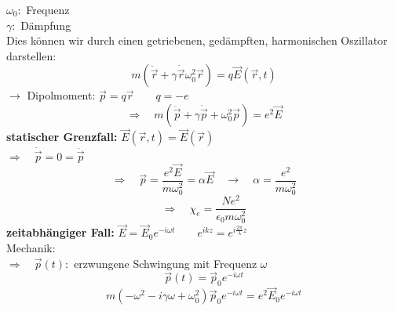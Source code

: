 \begin{center}
\end{center}
$ \omega_0 : $ Frequenz\\
$ \gamma : $ Dämpfung\\
Dies können wir durch einen getriebenen, gedämpften, harmonischen Oszillator darstellen:
\begin{equation*}
m(\ddot{\vec{r}} + \gamma \dot{\vec{r}} \omega_0^2 \vec{r}) = q \vec{E}(\vec{r},t)
\end{equation*}
$ \rightarrow $ Dipolmoment: $ \vec{p} = q \vec{r} \qquad q = -e $
\begin{equation*}
\Rightarrow \quad m(\ddot{\vec{p}} + \gamma \dot{\vec{p}} + \omega_0^2 \vec{p}) = e^2 \vec{E}
\end{equation*}
\textbf{statischer Grenzfall:} $ \vec{E}(\vec{r},t) = \vec{E}(\vec{r}) $\\
$ \Rightarrow \quad \dot{\vec{p}} = 0 = \ddot{\vec{p}} $\\
\begin{equation*}
\Rightarrow \quad \vec{p} = \frac{e^2 \vec{E}}{m \omega_0^2} = \alpha \vec{E} \quad \rightarrow \quad \alpha = \frac{e^2}{m \omega_0^2}
\end{equation*}
\begin{equation*}
\Rightarrow \quad \chi_e = \frac{N e^2}{\epsilon_0 m \omega_0^2}
\end{equation*}
\textbf{zeitabhängiger Fall:} $ \vec{E} = \vec{E}_0 e^{-i \omega t} \qquad e^{ikz} = e^{i \frac{2 \pi}{\lambda} z} $\\[5pt]
Mechanik:\\
$ \Rightarrow \quad \vec{p}(t) : $ erzwungene Schwingung mit Frequenz $ \omega $
\begin{equation*}
\vec{p}(t) = \vec{p}_0 e^{- i \omega t}
\end{equation*}
\begin{equation*}
m ( - \omega^2 - i \gamma \omega + \omega_0^2) \vec{p}_0 e^{-i \omega t} = e^2 \vec{E}_0 e^{-i \omega t}
\end{equation*}
